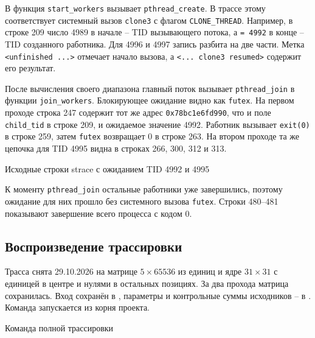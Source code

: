 \documentclass[12pt,a4paper]{article}
\begin{document}
В  функция \texttt{start\_workers} вызывает \texttt{pthread\_create}. В трассе этому соответствует системный вызов \texttt{clone3} с флагом \texttt{CLONE\_THREAD}. Например, в строке 209 число 4989 в начале -- TID вызывающего потока, а \texttt{= 4992} в конце -- TID созданного работника. Для 4996 и 4997 запись разбита на две части. Метка \texttt{<unfinished ...>} отмечает начало вызова, а \texttt{<... clone3 resumed>} содержит его результат.

После вычисления своего диапазона главный поток вызывает \texttt{pthread\_join} в функции \texttt{join\_workers}. Блокирующее ожидание видно как \texttt{futex}. На первом проходе строка 247 содержит тот же адрес \texttt{0x78bc1e6fd990}, что и поле \texttt{child\_tid} в строке 209, и ожидаемое значение 4992. Работник вызывает \texttt{exit(0)} в строке 259, затем \texttt{futex} возвращает 0 в строке 263. На втором проходе та же цепочка для TID 4995 видна в строках 266, 300, 312 и 313.

\par\noindent\begin{minipage}{\linewidth}
\begin{listingblock}{Исходные строки strace с ожиданием TID 4992 и 4995}
\end{listingblock}
\end{minipage}\par

К моменту \texttt{pthread\_join} остальные работники уже завершились, поэтому ожидание для них прошло без системного вызова \texttt{futex}. Строки 480--481 показывают завершение всего процесса с кодом 0.

\subsection{Воспроизведение трассировки}

Трасса снята 29.10.2026 на матрице $5\times65536$ из единиц и ядре $31\times31$ с единицей в центре и нулями в остальных позициях. За два прохода матрица сохранилась. Вход сохранён в , параметры и контрольные суммы исходников -- в . Команда запускается из корня проекта.

\begin{listingblock}{Команда полной трассировки}
\end{listingblock}
\end{document}

